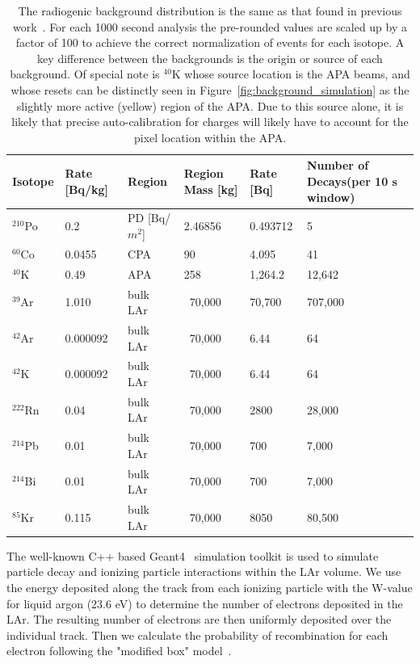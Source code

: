 \begin{table}
\begin{centering}
\begin{tabular}{|p{15mm} p{15mm} p{20mm} p{20mm} p{20mm} p{35mm} |}
 \hline
 Isotope & Rate [Bq/kg] & Region & Region Mass [kg] & Rate [Bq] & Number of Decays\newline (per 10 s window) \\ [0.5ex]
 \hline\hline
  $^{210}$Po & 0.2 & PD [Bq/$m^2$] & 2.46856 & 0.493712 & 5 \\
  $^{60}$Co & 0.0455 & CPA & 90 & 4.095 & 41 \\
  $^{40}$K & 0.49 & APA & 258 & 1,264.2 & 12,642 \\
  $^{39}$Ar & 1.010 & bulk LAr & ~70,000 & 70,700 & 707,000 \\
  $^{42}$Ar & 0.000092 & bulk LAr & ~70,000 & 6.44 & 64 \\
  $^{42}$K  & 0.000092 & bulk LAr & ~70,000 & 6.44 & 64 \\
  $^{222}$Rn & 0.04 & bulk LAr & ~70,000 & 2800 & 28,000 \\
  $^{214}$Pb & 0.01 & bulk LAr & ~70,000 & 700 & 7,000 \\
  $^{214}$Bi & 0.01 & bulk LAr & ~70,000 & 700 & 7,000 \\
  $^{85}$Kr & 0.115 & bulk LAr & ~70,000 & 8050 & 80,500 \\
 \hline
\end{tabular}
\caption{The radiogenic background distribution is the same as that found in previous work~\citep{qpix:shion}.
For each 1000 second analysis the pre-rounded values are scaled up by a factor of 100 to achieve the correct normalization of events for each isotope.
A key difference between the backgrounds is the origin or source of each background.
Of special note is $^{40}$K whose source location is the APA beams, and whose resets can be distinctly seen in Figure~\ref{fig:background_simulation} as the slightly more active (yellow) region of the APA.
Due to this source alone, it is likely that precise auto-calibration for charges will likely have to account for the pixel location within the APA.
}
\label{table:radiogenic_backgrounds}
\end{centering}
\end{table}

The well-known C++ based Geant4~\citep{geant4:AGOSTINELLI2003250} simulation toolkit is used to simulate particle decay and ionizing particle interactions within the LAr volume.
We use the energy deposited along the track from each ionizing particle with the W-value for liquid argon (23.6 eV) to determine the number of electrons deposited in the LAr.
The resulting number of electrons are then uniformly deposited over the individual track.
Then we calculate the probability of recombination for each electron following the "modified box" model~\citep{2013JInst...8P8005A}.

